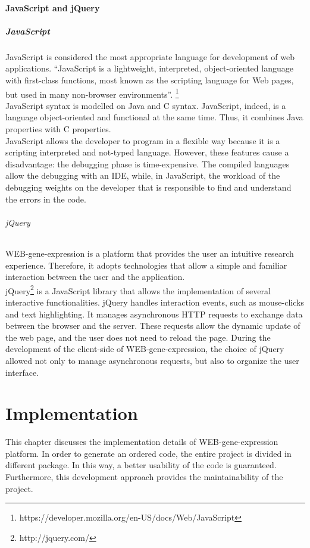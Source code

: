 \documentclass[a4paper]{report}
\begin{document}
\subsubsection{JavaScript and jQuery}

\paragraph{JavaScript}
JavaScript is considered the most appropriate language for development of web applications.
 ``JavaScript is a lightweight, interpreted, object-oriented language with first-class functions, most known as the scripting language for Web pages, but used in many non-browser environments''. \footnote{https://developer.mozilla.org/en-US/docs/Web/JavaScript}\\
JavaScript syntax is modelled on Java and C syntax. JavaScript, indeed, is a language object-oriented and functional at the same time. Thus, it combines Java properties with C properties.\\
JavaScript allows the developer to program in a flexible way because it is a scripting interpreted and not-typed language. However, these features cause a disadvantage: the debugging phase is time-expensive. The compiled languages allow the debugging with an IDE, while, in JavaScript, the workload of the debugging weights on the developer that is responsible to find and understand the errors in the code.

\subparagraph{jQuery}
 WEB-gene-expression is a platform that provides the user an intuitive research experience. Therefore, it adopts technologies that allow a simple and familiar interaction between the user and the application.\\
jQuery\footnote{http://jquery.com/} is a JavaScript library that allows the implementation of several interactive functionalities. jQuery handles interaction events, such as mouse-clicks and text highlighting. It manages asynchronous HTTP requests to exchange data between the browser and the server. These requests allow the dynamic update of the web page, and the user does not need to reload the page. During the development of the client-side of WEB-gene-expression, the choice of jQuery allowed not only to manage asynchronous requests, but also to organize the user interface. \\

\chapter{Implementation}
This chapter discusses the implementation details of WEB-gene-expression platform. In order to generate an ordered code, the entire project is divided in different package. In this way, a better usability of the code is guaranteed. Furthermore, this development approach provides the maintainability of the project.
\end{document}
